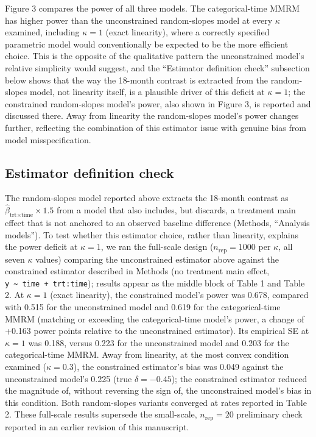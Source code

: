 \documentclass[
  11pt,
]{article}
\begin{document}
Figure 3 compares the power of all three models. The
categorical-time MMRM has higher power than the unconstrained
random-slopes model at every \(\kappa\) examined, including
\(\kappa = 1\) (exact linearity), where a correctly specified
parametric model would conventionally be expected to be the
more efficient choice. This is the opposite of the qualitative
pattern the unconstrained model's relative simplicity would
suggest, and the ``Estimator definition check'' subsection below
shows that the way the 18-month contrast is extracted from the
random-slopes model, not linearity itself, is a plausible
driver of this deficit at \(\kappa = 1\); the constrained
random-slopes model's power, also shown in Figure 3, is
reported and discussed there. Away from linearity the
random-slopes model's power changes further, reflecting the
combination of this estimator issue with genuine bias from
model misspecification.

\subsection{Estimator definition check}\label{estimator-definition-check}

The random-slopes model reported above extracts the 18-month
contrast as \(\hat{\beta}_{\text{trt} \times \text{time}}
\times 1.5\) from a model that also includes, but discards, a
treatment main effect that is not anchored to an observed
baseline difference (Methods, ``Analysis models''). To test
whether this estimator choice, rather than linearity, explains
the power deficit at \(\kappa = 1\), we ran the full-scale design
(\(n_{\mathrm{rep}} = 1000\) per \(\kappa\), all seven \(\kappa\)
values) comparing the unconstrained estimator above against the
constrained estimator described in Methods (no treatment main
effect, \texttt{y\ \textasciitilde{}\ time\ +\ trt:time}); results appear as the middle
block of Table 1 and Table 2. At \(\kappa = 1\) (exact linearity),
the constrained model's power was
0.678, compared with
0.515 for the unconstrained
model and 0.619 for the
categorical-time MMRM
(matching or exceeding
the categorical-time model's power, a change of
+0.163 power points relative to
the unconstrained estimator). Its empirical SE at \(\kappa = 1\) was
0.188, versus
0.223 for the unconstrained
model and 0.203 for the
categorical-time MMRM. Away from linearity, at the most convex
condition examined
(\(\kappa = 0.3\)), the constrained
estimator's bias was 0.049
against the unconstrained model's
0.225 (true
\(\delta = -0.45\)); the constrained estimator
reduced the magnitude of, without reversing the sign of, the unconstrained model's bias in this
condition. Both random-slopes variants converged at rates
reported in Table 2. These full-scale results supersede the
small-scale, \(n_{\mathrm{rep}} = 20\) preliminary check reported in
an earlier revision of this manuscript.
\end{document}
